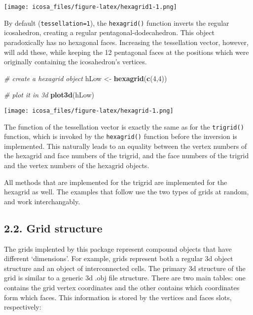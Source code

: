\documentclass[]{article}
\newenvironment{Shaded}{\begin{snugshade}}{\end{snugshade}}
\newcommand{\KeywordTok}[1]{\textcolor[rgb]{0.13,0.29,0.53}{\textbf{#1}}}
\newcommand{\DecValTok}[1]{\textcolor[rgb]{0.00,0.00,0.81}{#1}}
\newcommand{\StringTok}[1]{\textcolor[rgb]{0.31,0.60,0.02}{#1}}
\newcommand{\CommentTok}[1]{\textcolor[rgb]{0.56,0.35,0.01}{\textit{#1}}}
\newcommand{\NormalTok}[1]{#1}
\begin{document}
\texttt{[image: icosa\_files/figure-latex/hexagrid1-1.png]}

By default (\texttt{tessellation=1}), the \texttt{hexagrid()} function
inverts the regular icosahedron, creating a regular
pentagonal-dodecahedron. This object paradoxically has no hexagonal
faces. Increasing the tessellation vector, however, will add these,
while keeping the 12 pentagonal faces at the positions which were
originally containing the icosahedron's vertices.

\begin{Shaded}
\begin{Highlighting}[]
\CommentTok{# create a hexagrid object}
\NormalTok{hLow <-}\StringTok{ }\KeywordTok{hexagrid}\NormalTok{(}\KeywordTok{c}\NormalTok{(}\DecValTok{4}\NormalTok{,}\DecValTok{4}\NormalTok{))}

\CommentTok{# plot it in 3d}
\KeywordTok{plot3d}\NormalTok{(hLow)}
\end{Highlighting}
\end{Shaded}

\texttt{[image: icosa\_files/figure-latex/hexagrid-1.png]}

The function of the tessellation vector is exactly the same as for the
\texttt{trigrid()} function, which is invoked by the \texttt{hexagrid()}
function before the inversion is implemented. This naturally leads to an
equality between the vertex numbers of the hexagrid and face numbers of
the trigrid, and the face numbers of the trigrid and the vertex numbers
of the hexagrid objects.

All methods that are implemented for the trigrid are implemented for the
hexagrid as well. The examples that follow use the two types of grids at
random, and work interchangably.

\subsection{2.2. Grid structure}\label{grid-structure}

The grids implented by this package represent compound objects that have
different `dimensions'. For example, grids represent both a regular 3d
object structure and an object of interconnected cells. The primary 3d
structure of the grid is similar to a generic 3d .obj file structure.
There are two main tables: one contains the grid vertex coordinates and
the other contains which coordinates form which faces. This information
is stored by the vertices and faces slots, respectively:
\end{document}
